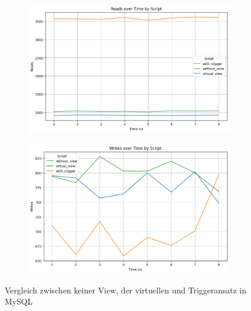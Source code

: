 \vspace{-5pt}
\begin{figure}[H]
    \centering
    \begin{subfigure}[t]{0.48\textwidth}
        \includegraphics[width=\textwidth]{PNGs/Script/Views/view-comparison/Reads}
    \end{subfigure}
    \hfill
    \begin{subfigure}[t]{0.48\textwidth}
        \includegraphics[width=\textwidth]{PNGs/Script/Views/view-comparison/Writes}
    \end{subfigure}
    \vspace{-5pt}
    \caption[Views: Keine View, virtuelle View und Ansatz mit Triggern]{Vergleich zwischen keiner View, der virtuellen und Triggeransatz in MySQL}
    \label{fig:view-comparison-comp-metric}
\end{figure}
\vspace{-15pt}

